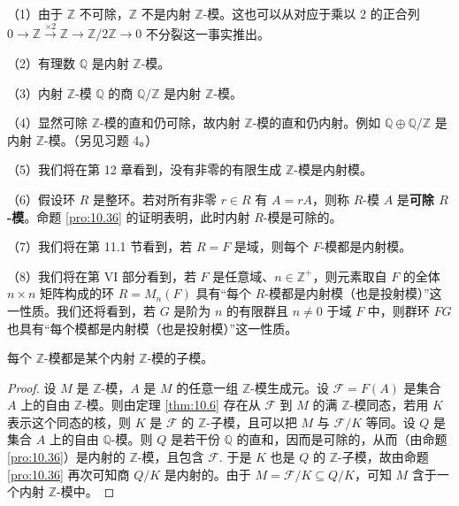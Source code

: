 \begin{example}
（1）由于 \(\mathbb{Z}\) 不可除，\(\mathbb{Z}\) 不是内射 \(\mathbb{Z}\)-模。这也可以从对应于乘以 2 的正合列 \(0 \to \mathbb{Z} \xrightarrow{\times 2} \mathbb{Z} \to \mathbb{Z}/2\mathbb{Z} \to 0\) 不分裂这一事实推出。

（2）有理数 \(\mathbb{Q}\) 是内射 \(\mathbb{Z}\)-模。

（3）内射 \(\mathbb{Z}\)-模 \(\mathbb{Q}\) 的商 \(\mathbb{Q}/\mathbb{Z}\) 是内射 \(\mathbb{Z}\)-模。

（4）显然可除 \(\mathbb{Z}\)-模的直和仍可除，故内射 \(\mathbb{Z}\)-模的直和仍内射。例如 \(\mathbb{Q} \oplus \mathbb{Q}/\mathbb{Z}\) 是内射 \(\mathbb{Z}\)-模。（另见习题 4。）

（5）我们将在第 12 章看到，没有非零的有限生成 \(\mathbb{Z}\)-模是内射模。

（6）假设环 \(R\) 是整环。若对所有非零 \(r \in R\) 有 \(A = rA\)，则称 \(R\)-模 \(A\) 是\textbf{可除 \(R\)-模}。命题 \ref{pro:10.36} 的证明表明，此时内射 \(R\)-模是可除的。

（7）我们将在第 11.1 节看到，若 \(R = F\) 是域，则每个 \(F\)-模都是内射模。

（8）我们将在第 VI 部分看到，若 \(F\) 是任意域、\(n \in \mathbb{Z}^+\)，则元素取自 \(F\) 的全体 \(n \times n\) 矩阵构成的环 \(R = M_n(F)\) 具有“每个 \(R\)-模都是内射模（也是投射模）”这一性质。我们还将看到，若 \(G\) 是阶为 \(n\) 的有限群且 \(n \neq 0\) 于域 \(F\) 中，则群环 \(FG\) 也具有“每个模都是内射模（也是投射模）”这一性质。
\end{example}

\begin{corollary}\label{cor:10.37}
每个 \(\mathbb{Z}\)-模都是某个内射 \(\mathbb{Z}\)-模的子模。
\end{corollary}

\begin{proof}
设 \(M\) 是 \(\mathbb{Z}\)-模，\(A\) 是 \(M\) 的任意一组 \(\mathbb{Z}\)-模生成元。设 \(\mathcal{F} = F(A)\) 是集合 \(A\) 上的自由 \(\mathbb{Z}\)-模。则由定理 \ref{thm:10.6} 存在从 \(\mathcal{F}\) 到 \(M\) 的满 \(\mathbb{Z}\)-模同态，若用 \(K\) 表示这个同态的核，则 \(K\) 是 \(\mathcal{F}\) 的 \(\mathbb{Z}\)-子模，且可以把 \(M\) 与 \(\mathcal{F}/K\) 等同。设 \(Q\) 是集合 \(A\) 上的自由 \(\mathbb{Q}\)-模。则 \(Q\) 是若干份 \(\mathbb{Q}\) 的直和，因而是可除的，从而（由命题 \ref{pro:10.36}）是内射的 \(\mathbb{Z}\)-模，且包含 \(\mathcal{F}\). 于是 \(K\) 也是 \(Q\) 的 \(\mathbb{Z}\)-子模，故由命题 \ref{pro:10.36} 再次可知商 \(Q/K\) 是内射的。由于 \(M = \mathcal{F}/K \subseteq Q/K\)，可知 \(M\) 含于一个内射 \(\mathbb{Z}\)-模中。
\end{proof}

